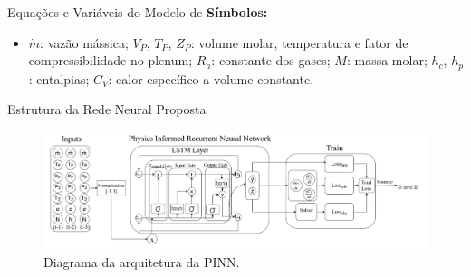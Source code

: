 \begin{frame}{Equações e Variáveis do Modelo de \cite{Meira2022}}
    \vspace{0.2cm}
    \textbf{Símbolos:}
    \begin{itemize}
        \item \( \dot{m} \): vazão mássica; 
        \( V_P \), \( T_P \), \( Z_P \): volume molar, temperatura e fator de compressibilidade no plenum;
        \( R_a \): constante dos gases; 
        \( M \): massa molar; 
        \( h_c \), \( h_p \): entalpias; 
        \( C_V \): calor específico a volume constante.
    \end{itemize}
\end{frame}

\begin{frame}{Estrutura da Rede Neural Proposta}
    \vspace{-0.3cm}
    \begin{figure}
        \centering
        \includegraphics[width=1.0\textwidth]{figures/PIRNN.png} %
        \caption{\small Diagrama da arquitetura da PINN.}
    \end{figure}
\end{frame}
